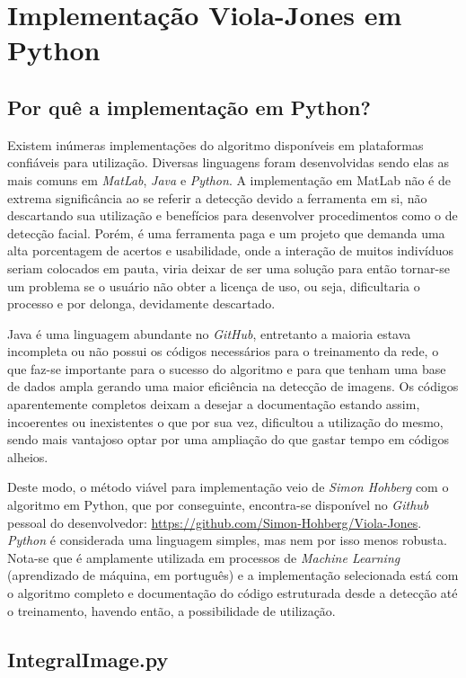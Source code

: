 \documentclass[12pt,a4paper]{article}
\begin{document}
\section{Implementação Viola-Jones em Python}

\subsection{Por quê a implementação em Python?}
	Existem inúmeras implementações do algoritmo disponíveis em plataformas confiáveis para utilização. Diversas linguagens foram desenvolvidas sendo elas as mais comuns em \textit{MatLab}, \textit{Java} e \textit{Python}. A implementação em MatLab não é de extrema significância ao se referir a detecção devido a ferramenta em si, não descartando sua utilização e benefícios para desenvolver procedimentos como o de detecção facial. Porém, é uma ferramenta paga e um projeto que demanda uma alta porcentagem de acertos e usabilidade, onde a interação de muitos indivíduos seriam colocados em pauta, viria deixar de ser uma solução para então tornar-se um problema se o usuário não obter a licença de uso, ou seja, dificultaria o processo e por delonga, devidamente descartado.  

	Java é uma linguagem abundante no \textit{GitHub}, entretanto a maioria estava incompleta ou não possui os códigos necessários para o treinamento da rede, o que faz-se importante para o sucesso do algoritmo e para que tenham uma base de dados ampla gerando uma maior eficiência na detecção de imagens. Os códigos aparentemente completos deixam a desejar a documentação estando assim, incoerentes ou inexistentes o que por sua vez, dificultou a utilização do mesmo, sendo mais vantajoso optar por uma ampliação do que gastar tempo em códigos alheios. 


	Deste modo, o método viável para implementação veio de \textit{Simon Hohberg} com o algoritmo em Python, que por conseguinte, encontra-se disponível no \textit{Github} pessoal do desenvolvedor:
\url{https://github.com/Simon-Hohberg/Viola-Jones}. \textit{Python} é considerada uma linguagem simples, mas nem por isso menos robusta. Nota-se que é amplamente utilizada em processos de \textit{Machine Learning} (aprendizado de máquina, em português) e a implementação selecionada está com o algoritmo completo e documentação do código estruturada desde a detecção até o treinamento, havendo então, a possibilidade de utilização. 



\subsection{IntegralImage.py}
\end{document}
